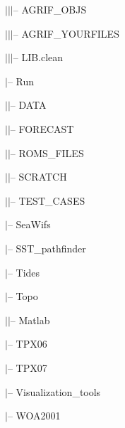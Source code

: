 $|$\hspace{0.5cm}$|$\hspace{0.5cm}$|$-- AGRIF\_OBJS

$|$\hspace{0.5cm}$|$\hspace{0.5cm}$|$-- AGRIF\_YOURFILES

$|$\hspace{0.5cm}$|$\hspace{0.5cm}$|$-- LIB.clean

$|$-- Run

$|$\hspace{0.5cm}$|$-- DATA


$|$\hspace{0.5cm}$|$-- FORECAST

$|$\hspace{0.5cm}$|$-- ROMS\_FILES

$|$\hspace{0.5cm}$|$-- SCRATCH

$|$\hspace{0.5cm}$|$-- TEST\_CASES

$|$-- SeaWifs

$|$-- SST\_pathfinder

$|$-- Tides

$|$-- Topo

$|$\hspace{0.5cm}$|$-- Matlab

$|$-- TPX06

$|$-- TPX07

$|$-- Visualization\_tools

$|$-- WOA2001

